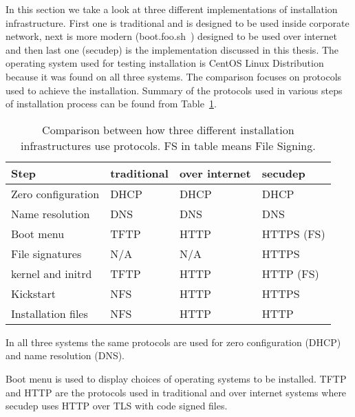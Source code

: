 
In this section we take a look at three different implementations of
installation infrastructure. First one is traditional and is designed
to be used inside corporate network, next is more modern
(boot.foo.sh~\cite{boot.foo.sh}) designed to be used over internet and
then last one (secudep) is the implementation discussed in this
thesis. The operating system used for testing installation is CentOS
Linux Distribution because it was found on all three systems. The
comparison focuses on protocols used to achieve the
installation. Summary of the protocols used in various steps of
installation process can be found from
Table~\ref{tab:comparison_table}.

\begin{table}[!ht]
  \def\arraystretch{1.1}%
  \begin{center}
    \label{tab:comparison_table}
    \begin{tabular}{| l | l | l | l |}
      \hline
      Step               & traditional & over internet & secudep    \\
      \hline
      Zero configuration & DHCP        & DHCP          & DHCP       \\
      Name resolution    & DNS         & DNS           & DNS        \\
      Boot menu          & TFTP        & HTTP          & HTTPS (FS) \\
      File signatures    & N/A         & N/A           & HTTPS      \\
      kernel and initrd  & TFTP        & HTTP          & HTTP (FS)  \\
      Kickstart          & NFS         & HTTP          & HTTPS      \\
      Installation files & NFS         & HTTP          & HTTP       \\
      \hline
    \end{tabular}
    \caption{Comparison between how three different installation
      infrastructures use protocols. FS in table means File Signing.}
  \end{center}
\end{table}

In all three systems the same protocols are used for zero
configuration (DHCP) and name resolution (DNS).

Boot menu is used to display choices of operating systems to be
installed. TFTP and HTTP are the protocols used in traditional and
over internet systems where secudep uses HTTP over TLS with code
signed files.

